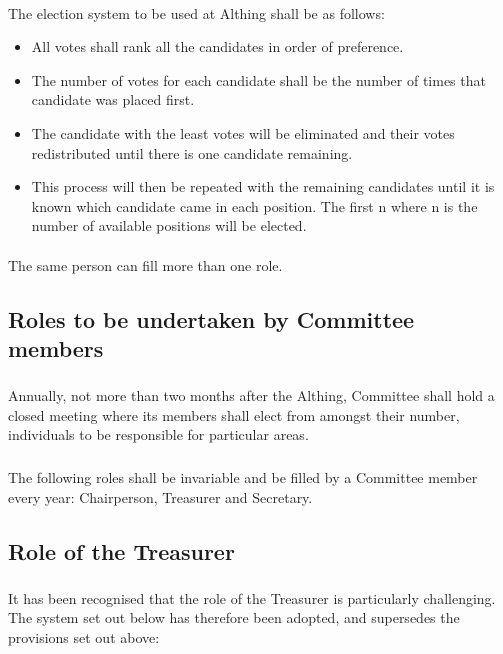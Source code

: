\documentclass[a4paper, 12pt]{article}
\begin{document}
\paragraph{}
\label{sec:electionprocedure}
The election system to be used at Althing shall be as follows:
\begin{itemize}
\item All votes shall rank all the candidates in order of preference.
\item The number of votes for each candidate shall be the number of times that candidate was placed first.
\item The candidate with the least votes will be eliminated and their votes redistributed until there is one candidate remaining.
\item This process will then be repeated with the remaining candidates until it is known which candidate came in each position. The first n where n is the number of available positions will be elected.
\end{itemize}

\paragraph{}
\label{sec:moreroles}
The same person can fill more than one role.

\subsection{Roles to be undertaken by Committee members}
\subsubsection{}
Annually, not more than two months after the Althing, Committee shall hold a closed meeting where its members shall elect from amongst their number, individuals to be responsible for particular areas.
\subsubsection{}
The following roles shall be invariable and be filled by a Committee member every year: Chairperson, Treasurer and Secretary.

\subsection{Role of the Treasurer}
\label{sec:treasurerrole}
\subsubsection{}
It has been recognised that the role of the Treasurer is particularly challenging. The system set out below has therefore been adopted, and supersedes the provisions set out above:
\end{document}

